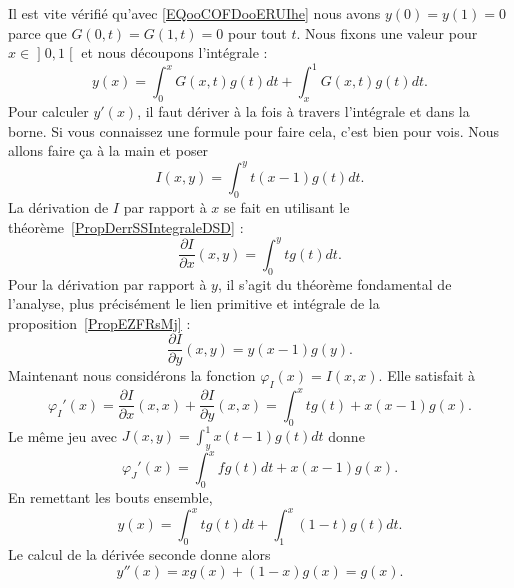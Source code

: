\begin{subproof}
    Il est vite vérifié qu'avec \eqref{EQooCOFDooERUIhe} nous avons \( y(0)=y(1)=0\) parce que \( G(0,t)=G(1,t)=0\) pour tout \( t\). Nous fixons une valeur pour \( x\in \mathopen] 0 , 1 \mathclose[\) et nous découpons l'intégrale :
        \begin{equation}
            y(x)=\int_0^xG(x,t)g(t)dt+\int_x^1G(x,t)g(t)dt.
        \end{equation}
        Pour calculer \( y'(x)\), il faut dériver à la fois à travers l'intégrale et dans la borne. Si vous connaissez une formule pour faire cela, c'est bien pour vois. Nous allons faire ça à la main et poser
        \begin{equation}
            I(x,y)=\int_0^yt(x-1)g(t)dt.
        \end{equation}
        La dérivation de \( I\) par rapport à \( x\) se fait en utilisant le théorème~\ref{PropDerrSSIntegraleDSD} :
        \begin{equation}
            \frac{ \partial I }{ \partial x }(x,y)=\int_0^ytg(t)dt.
        \end{equation}
        Pour la dérivation par rapport à \( y\), il s'agit du théorème fondamental de l'analyse, plus précisément le lien primitive et intégrale de la proposition~\ref{PropEZFRsMj} :
        \begin{equation}
            \frac{ \partial I }{ \partial y }(x,y)=y(x-1)g(y).
        \end{equation}
        Maintenant nous considérons la fonction \( \varphi_I(x)=I(x,x)\). Elle satisfait à
        \begin{equation}
            \varphi_I'(x)=\frac{ \partial I }{ \partial x }(x,x)+\frac{ \partial I }{ \partial y }(x,x)=\int_0^xtg(t)+x(x-1)g(x).
        \end{equation}
        Le même jeu avec \( J(x,y)=\int_y^1x(t-1)g(t)dt\) donne
        \begin{equation}
                \varphi_J'(x)=\int_0^xfg(t)dt+x(x-1)g(x).
        \end{equation}
        En remettant les bouts ensemble,
        \begin{equation}
            y(x)=\int_0^xtg(t)dt+\int_1^x(1-t)g(t)dt.
        \end{equation}
        Le calcul de la dérivée seconde donne alors
        \begin{equation}
            y''(x)=xg(x)+(1-x)g(x)=g(x).
        \end{equation}
\end{subproof}

